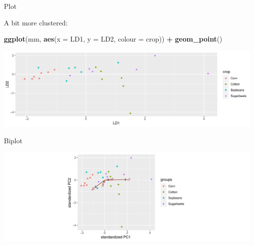 \documentclass[
  ignorenonframetext,
]{beamer}
\newenvironment{Shaded}{\begin{snugshade}}{\end{snugshade}}
\newcommand{\DataTypeTok}[1]{\textcolor[rgb]{0.13,0.29,0.53}{#1}}
\newcommand{\KeywordTok}[1]{\textcolor[rgb]{0.13,0.29,0.53}{\textbf{#1}}}
\newcommand{\NormalTok}[1]{#1}
\newcommand{\OperatorTok}[1]{\textcolor[rgb]{0.81,0.36,0.00}{\textbf{#1}}}
\newcommand{\StringTok}[1]{\textcolor[rgb]{0.31,0.60,0.02}{#1}}
\begin{document}
\begin{frame}[fragile]{Plot}
\protect\hypertarget{plot}{}

A bit more clustered:

\begin{Shaded}
\begin{Highlighting}[]
\KeywordTok{ggplot}\NormalTok{(mm, }\KeywordTok{aes}\NormalTok{(}\DataTypeTok{x =}\NormalTok{ LD1, }\DataTypeTok{y =}\NormalTok{ LD2, }\DataTypeTok{colour =}\NormalTok{ crop)) }\OperatorTok{+}
\StringTok{  }\KeywordTok{geom_point}\NormalTok{()}
\end{Highlighting}
\end{Shaded}

\includegraphics{slides_d29_files/figure-beamer/nedved-1.pdf}

\end{frame}

\begin{frame}[fragile]{Biplot}
\protect\hypertarget{biplot-2}{}

\begin{Shaded}
\end{Shaded}

\includegraphics{slides_d29_files/figure-beamer/unnamed-chunk-346-1.pdf}

\end{frame}
\end{document}
